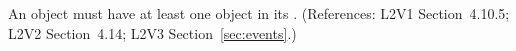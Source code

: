 An \Event object must have at least one \EventAssignment object in its
.  (References: L2V1 Section~4.10.5; L2V2
Section~4.14; L2V3 Section~\ref{sec:events}.)
